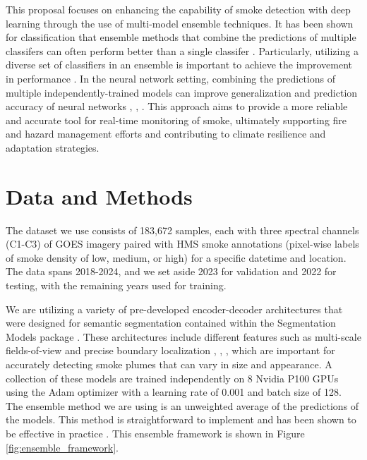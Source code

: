 \documentclass{article}
\begin{document}
This proposal focuses on enhancing the capability of smoke detection with deep learning through the use of multi-model ensemble techniques. It has been shown for classification that ensemble methods that combine the predictions of multiple classifers can often perform better than a single classifer \citep{ensemble-ml}. Particularly, utilizing a diverse set of classifiers in an ensemble is important to achieve the improvement in performance \citep{ensemble-diversity}. In the neural network setting, combining the predictions of multiple independently-trained models can improve generalization and prediction accuracy of neural networks \citep{nn-ensemble}, \citep{nn-ensemble2}, \citep{nn-error-ens}. This approach aims to provide a more reliable and accurate tool for real-time monitoring of smoke, ultimately supporting fire and hazard management efforts and contributing to climate resilience and adaptation strategies.

\section{Data and Methods}
The dataset we use consists of 183,672 samples, each with three spectral channels (C1-C3) of GOES imagery paired with HMS smoke annotations (pixel-wise labels of smoke density of low, medium, or high) for a specific datetime and location. The data spans 2018-2024, and we set aside 2023 for validation and 2022 for testing, with the remaining years used for training. 

We are utilizing a variety of pre-developed encoder-decoder architectures that were designed for semantic segmentation contained within the Segmentation Models package \citep{semantic}. These architectures include different features such as multi-scale fields-of-view and precise boundary localization \citep{dlv3p}, \citep{PAN}, \citep{UNetpp}, which are important for accurately detecting smoke plumes that can vary in size and appearance. A collection of these models are trained independently on 8 Nvidia P100 GPUs using the Adam optimizer with a learning rate of 0.001 and batch size of 128. 
The ensemble method we are using is an unweighted average of the predictions of the models. This method is straightforward to implement and has been shown to be effective in practice \citep{nn-ensemble2}. This ensemble framework is shown in Figure \ref{fig:ensemble_framework}. 
\end{document}
